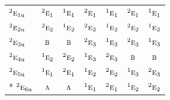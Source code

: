 \documentclass[10pt,a4paper]{article}
\numberwithin{equation}{section}
\newcommand{\irr}[1]{\text{\normalfont\scshape #1}}
\newcommand{\conjpair}[1]{{}^{#1}}
\newcommand{\ptag}[1]{\mathrm{#1}}
\begin{document}
{\begin{longtable}{@{}lcccccc@{}}
$\conjpair{2}\irr{e}_{1\ptag{u}}$ & $\conjpair{2}\irr{e}_{1}$ & $\conjpair{1}\irr{e}_{1}$ & $\conjpair{2}\irr{e}_{1}$ & $\conjpair{1}\irr{e}_{1}$ & $\conjpair{2}\irr{e}_{1}$ & $\conjpair{1}\irr{e}_{1}$\\
$\conjpair{2}\irr{e}_{2\ptag{u}}$ & $\conjpair{2}\irr{e}_{2}$ & $\conjpair{1}\irr{e}_{2}$ & $\conjpair{2}\irr{e}_{2}$ & $\conjpair{1}\irr{e}_{2}$ & $\conjpair{2}\irr{e}_{2}$ & $\conjpair{1}\irr{e}_{2}$\\
$\conjpair{2}\irr{e}_{3\ptag{u}}$ & $\irr{b}$ & $\irr{b}$ & $\conjpair{2}\irr{e}_{3}$ & $\conjpair{1}\irr{e}_{3}$ & $\conjpair{2}\irr{e}_{3}$ & $\conjpair{1}\irr{e}_{3}$\\
$\conjpair{2}\irr{e}_{4\ptag{u}}$ & $\conjpair{1}\irr{e}_{2}$ & $\conjpair{2}\irr{e}_{2}$ & $\conjpair{1}\irr{e}_{3}$ & $\conjpair{2}\irr{e}_{3}$ & $\irr{b}$ & $\irr{b}$\\
$\conjpair{2}\irr{e}_{5\ptag{u}}$ & $\conjpair{1}\irr{e}_{1}$ & $\conjpair{2}\irr{e}_{1}$ & $\conjpair{1}\irr{e}_{2}$ & $\conjpair{2}\irr{e}_{2}$ & $\conjpair{1}\irr{e}_{3}$ & $\conjpair{2}\irr{e}_{3}$\\*
$\conjpair{2}\irr{e}_{6\ptag{u}}$ & $\irr{a}$ & $\irr{a}$ & $\conjpair{1}\irr{e}_{1}$ & $\conjpair{2}\irr{e}_{1}$ & $\conjpair{1}\irr{e}_{2}$ & $\conjpair{2}\irr{e}_{2}$\\
\bottomrule\end{longtable}}
\end{document}
